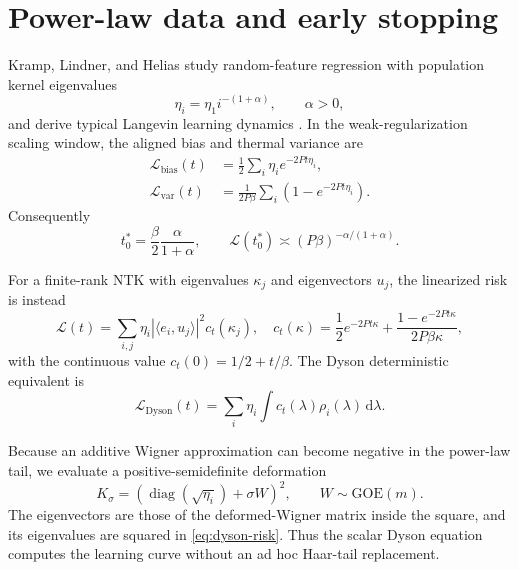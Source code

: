 \documentclass{article}
\newcommand{\diag}{\operatorname{diag}}
\newcommand{\dd}{\,\mathrm d}
\newcommand{\GOE}{\mathrm{GOE}}
\begin{document}
\section{Power-law data and early stopping}
\label{sec:powerlaw}

Kramp, Lindner, and Helias study random-feature regression with population
kernel eigenvalues
\begin{equation}
\eta_i=\eta_1i^{-(1+\alpha)},\qquad \alpha>0,
\label{eq:powerlaw}
\end{equation}
and derive typical Langevin learning dynamics \citep{KrampLindnerHelias2026}.
In the weak-regularization scaling window, the aligned bias and thermal
variance are
\begin{align}
\mathcal L_{\mathrm{bias}}(t)
&=\frac12\sum_i\eta_i e^{-2Pt\eta_i},\label{eq:aligned-bias}\\
\mathcal L_{\mathrm{var}}(t)
&=\frac1{2P\beta}\sum_i(1-e^{-2Pt\eta_i}).
\label{eq:aligned-var}
\end{align}
Consequently
\begin{equation}
t_0^*=\frac\beta2\frac{\alpha}{1+\alpha},
\qquad
\mathcal L(t_0^*)\asymp(P\beta)^{-\alpha/(1+\alpha)}.
\label{eq:aligned-stopping}
\end{equation}

For a finite-rank NTK with eigenvalues \(\kappa_j\) and eigenvectors \(u_j\),
the linearized risk is instead
\begin{equation}
\mathcal L(t)
=\sum_{i,j}\eta_i|\langle e_i,u_j\rangle|^2c_t(\kappa_j),
\quad
c_t(\kappa)=\frac12e^{-2Pt\kappa}
+\frac{1-e^{-2Pt\kappa}}{2P\beta\kappa},
\label{eq:mixed-risk}
\end{equation}
with the continuous value \(c_t(0)=1/2+t/\beta\).  The Dyson deterministic
equivalent is
\begin{equation}
\mathcal L_{\mathrm{Dyson}}(t)
=\sum_i\eta_i\int c_t(\lambda)\rho_i(\lambda)\dd\lambda.
\label{eq:dyson-risk}
\end{equation}

Because an additive Wigner approximation can become negative in the
power-law tail, we evaluate a positive-semidefinite deformation
\begin{equation}
K_\sigma=
\left(\diag(\sqrt{\eta_i})+\sigma W\right)^2,
\qquad W\sim\GOE(m).
\label{eq:psd-deformation}
\end{equation}
The eigenvectors are those of the deformed-Wigner matrix inside the square,
and its eigenvalues are squared in \eqref{eq:dyson-risk}.  Thus the scalar
Dyson equation computes the learning curve without an ad hoc Haar-tail
replacement.
\end{document}
